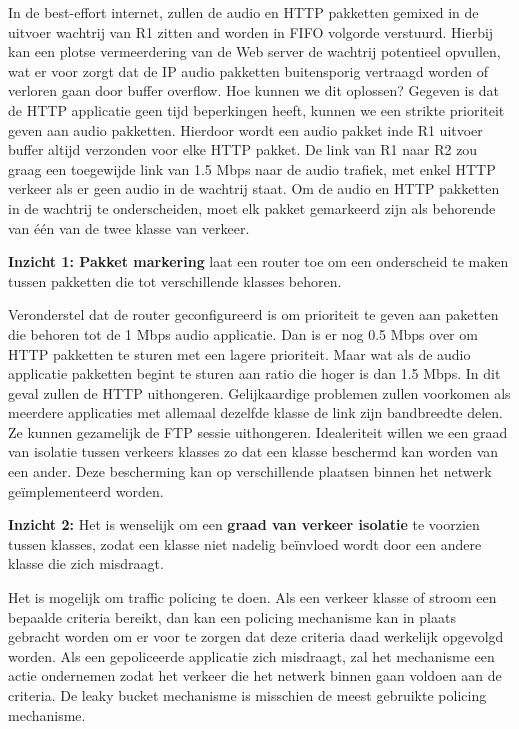 \noindent In de best-effort internet, zullen de audio en HTTP pakketten gemixed in de uitvoer wachtrij van R1 zitten and worden in FIFO volgorde verstuurd. Hierbij kan een plotse vermeerdering van de Web server de wachtrij potentieel opvullen, wat er voor zorgt dat de IP audio pakketten buitensporig vertraagd worden of verloren gaan door buffer overflow.
Hoe kunnen we dit oplossen? Gegeven is dat de HTTP applicatie geen tijd beperkingen heeft, kunnen we een strikte prioriteit geven aan audio pakketten. Hierdoor wordt een audio pakket inde R1 uitvoer buffer altijd verzonden voor elke HTTP pakket. De link van R1 naar R2 zou graag een toegewijde link van 1.5 Mbps naar de audio trafiek, met enkel HTTP verkeer als er geen audio in de wachtrij staat. Om de audio en HTTP pakketten in de wachtrij te onderscheiden, moet elk pakket gemarkeerd zijn als behorende van één van de twee klasse van verkeer.

\noindent \textbf{Inzicht 1: Pakket markering} laat een router toe om een onderscheid te maken tussen pakketten die tot verschillende klasses behoren.

\noindent Veronderstel dat de router geconfigureerd is om prioriteit te geven aan paketten die behoren tot de 1 Mbps audio applicatie. Dan is er nog 0.5 Mbps over om HTTP pakketten te sturen met een lagere prioriteit. Maar wat als de audio applicatie pakketten begint te sturen aan ratio die hoger is dan 1.5 Mbps. In dit geval zullen de HTTP uithongeren. Gelijkaardige problemen zullen voorkomen als meerdere applicaties met allemaal dezelfde klasse de link zijn bandbreedte delen. Ze kunnen gezamelijk de FTP sessie uithongeren. Idealeriteit willen we een graad van isolatie tussen verkeers klasses zo dat een klasse beschermd kan worden van een ander. Deze bescherming kan op verschillende plaatsen binnen het netwerk geïmplementeerd worden.

\noindent\textbf{Inzicht 2:} Het is wenselijk om een \textbf{graad van verkeer isolatie} te voorzien tussen klasses, zodat een klasse niet nadelig beïnvloed wordt door een andere klasse die zich misdraagt.

\noindent Het is mogelijk om traffic policing te doen. Als een verkeer klasse of stroom een bepaalde criteria bereikt, dan kan een policing mechanisme kan in plaats gebracht worden om er voor te zorgen dat deze criteria daad werkelijk opgevolgd worden. Als een gepoliceerde applicatie zich misdraagt, zal het mechanisme een actie ondernemen zodat het verkeer die het netwerk binnen gaan voldoen aan de criteria. 
\noindent De leaky bucket mechanisme is misschien de meest gebruikte policing mechanisme.

